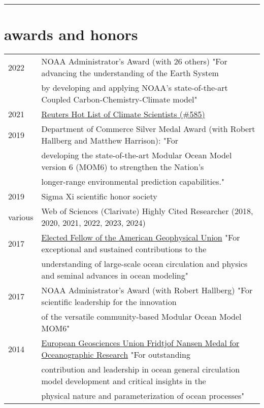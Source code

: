 \documentclass{article}
\begin{document}
\noindent\rule{\textwidth}{1pt}
\vspace{-.5cm}
\section*{\sc  \color{Maroon}   awards and honors}
\vspace{-.25cm}

\begin{tabular}{ll}
  2022 & NOAA Administrator's Award (with 26 others) "For advancing the understanding of the Earth System \\ & by developing and applying NOAA's state-of-the-art Coupled Carbon-Chemistry-Climate model"
\\
  2021 & \href{https://app.dimensions.ai/details/entities/publication/author/ur.010052126545.52}{Reuters Hot List of Climate Scientists (\#585)} 
  \\
  2019 & Department of Commerce Silver Medal Award (with Robert Hallberg and Matthew Harrison): "For \\ &  developing the state-of-the-art Modular Ocean Model version 6 (MOM6) to strengthen the Nation's \\& longer-range environmental prediction capabilities."
  \\
  2019 & Sigma Xi scientific honor society 
  \\
  various  & Web of Sciences (Clarivate) Highly Cited Researcher (2018, 2020, 2021, 2022, 2023, 2024)
  \\
  2017 & \href{https://eos.org/agu-news/celebrating-the-2017-class-of-fellows}{Elected Fellow of the American Geophysical Union} "For exceptional and sustained contributions to the \\ &  understanding of large-scale ocean circulation and physics and seminal advances in ocean modeling"
\\
  2017 & NOAA Administrator's Award (with Robert Hallberg) "For scientific leadership for the innovation \\ & of the versatile  community-based Modular Ocean Model MOM6" 
  \\
  2014 & \href{http://www.egu.eu/awards-medals/fridtjof-nansen/2014/stephen-m-griffies/}{European Geosciences Union Fridtjof Nansen Medal for
         Oceanographic Research}  "For 
outstanding \\ & contribution and leadership in 
ocean general circulation model development 
and critical insights in the \\ & physical 
nature and parameterization of ocean processes"

\end{tabular}
\end{document}

